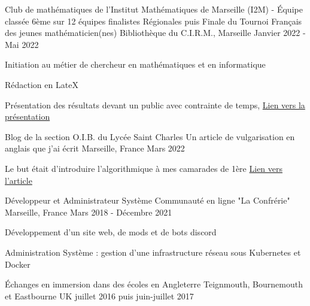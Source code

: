 \begin{cventries}
  \cventry
    {Club de mathématiques de l'Institut Mathématiques de Marseille (I2M) - Équipe classée 6ème sur 12 équipes finalistes} %
    {Régionales puis Finale du Tournoi Français des jeunes mathématicien(nes)} %
    {Bibliothèque du C.I.R.M., Marseille} %
    {Janvier 2022 - Mai 2022} %
    {
      \begin{cvitems} %
        \item Initiation au métier de chercheur en mathématiques et en informatique
        \item Rédaction en LateX
        \item Présentation des résultats devant un public avec contrainte de temps, \href{https://github.com/Aur3m/tfjm_souvenir/blob/main/Sujets_Mas__tfjm2_finale.pdf}{Lien vers la présentation}
      \end{cvitems}
    }

  \cventry
    {Blog de la section O.I.B. du Lycée Saint Charles} %
    {Un article de vulgarisation en anglais que j'ai écrit} %
    {Marseille, France} %
    {Mars 2022} %
    {
      \begin{cvitems} %
      \item Le but était d'introduire l'algorithmique à mes camarades de 1ère  \href{https://oibstcharles.blogspot.com/2022/03/algorithmics-my-personal-experience.html}{Lien vers l'article}
    \end{cvitems}
    }

  \cventry
    {Développeur et Administrateur Système} %
    {Communauté en ligne "La Confrérie"} %
    {Marseille, France} %
    {Mars 2018 - Décembre 2021} %
    {
      \begin{cvitems} %
      \item Développement d'un site web, de mods et de bots discord
      \item Administration Système : gestion d'une infrastructure réseau sous Kubernetes et Docker
    \end{cvitems}
    }

    \cventry
    {} %
    {Échanges en immersion dans des écoles en Angleterre} %
    {Teignmouth, Bournemouth et Eastbourne UK} %
    {juillet 2016 puis juin-juillet 2017} %
    {
    }


\end{cventries}
